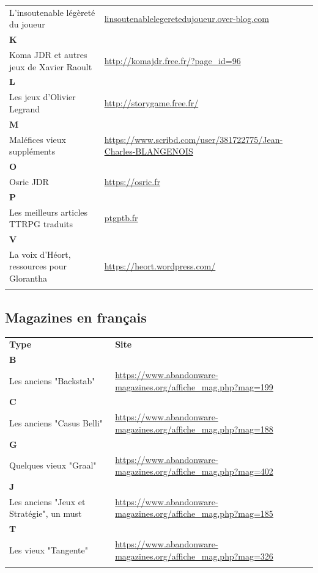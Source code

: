 \documentclass[a4paper, 11pt, twoside]{article}
\begin{document}
\begin{longtable}{p{7cm}p{7cm}}
L'insoutenable légèreté du joueur & \href{http://linsoutenablelegeretedujoueur.over-blog.com/}{linsoutenablelegeretedujoueur.over-blog.com}\\
\textbf{K} & \\
Koma JDR et autres jeux de Xavier Raoult & \url{http://komajdr.free.fr/?page\_id=96}\\
\textbf{L} & \\
Les jeux d'Olivier Legrand & \url{http://storygame.free.fr/}\\
\textbf{M} & \\
Maléfices vieux suppléments & \url{https://www.scribd.com/user/381722775/Jean-Charles-BLANGENOIS}\\
\textbf{O} & \\
Osric JDR & \url{https://osric.fr}\\
\textbf{P} & \\
Les meilleurs articles TTRPG traduits & \href{https://ptgptb.fr}{ptgptb.fr}\\
\textbf{V} & \\
La voix d'Héort, ressources pour Glorantha & \url{https://heort.wordpress.com/}\\
 & \\
\end{longtable}

\subsection{Magazines en français}
\label{sec:orgc933e43}

\begin{longtable}{p{7cm}p{7cm}}
\textbf{Type} & \textbf{Site}\\
\textbf{B} & \\
Les anciens "Backstab" & \url{https://www.abandonware-magazines.org/affiche\_mag.php?mag=199}\\
\textbf{C} & \\
Les anciens "Casus Belli" & \url{https://www.abandonware-magazines.org/affiche\_mag.php?mag=188}\\
\textbf{G} & \\
Quelques vieux "Graal" & \url{https://www.abandonware-magazines.org/affiche\_mag.php?mag=402}\\
\textbf{J} & \\
Les anciens "Jeux et Stratégie", un must & \url{https://www.abandonware-magazines.org/affiche\_mag.php?mag=185}\\
\textbf{T} & \\
Les vieux "Tangente" & \url{https://www.abandonware-magazines.org/affiche\_mag.php?mag=326}\\
 & \\
\end{longtable}
\end{document}
